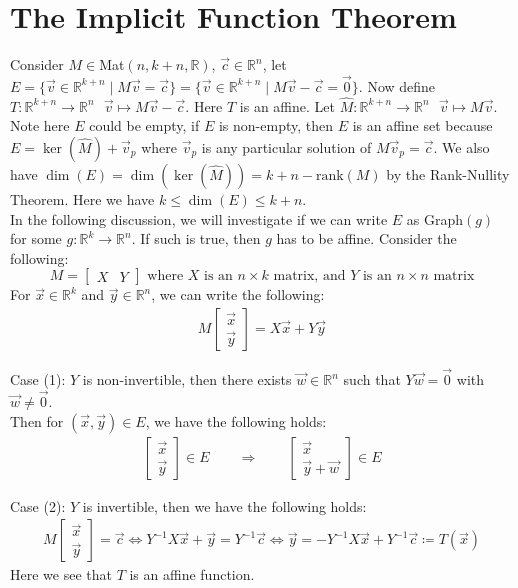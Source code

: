 \documentclass[11pt,oneside]{book}
\theoremstyle{break}
\theoremstyle{break}
\newcommand{\R}{\mathbb{R}}
\begin{document}
\newpage
\section[The Implicit Function Theorem]{\color{red}The Implicit Function Theorem \color{black}}
Consider $M \in $Mat$(n,k+n,\R)$, $\vec{c}\in \R^n$, let $E=\{ \vec{v}\in \R^{k+n} \mid M\vec{v} = \vec{c}\}=\{ \vec{v}\in \R^{k+n} \mid M\vec{v}- \vec{c}=\vec{0}\}$. Now define $T:\R^{k+n} \to \R^{n} \ \ \ \vec{v}\mapsto M\vec{v}-\vec{c}$. Here $T$ is an affine.  Let $\hat{M}: \R^{k+n} \to \R^n \ \ \ \vec{v}\mapsto M\vec{v}$. Note here $E$ could be empty, if $E$ is non-empty, then $E $ is an affine set because $E=\ker(\hat{M})+\vec{v}_p$ where $\vec{v}_p$ is any particular solution of $M\vec{v}_p = \vec{c}$. We also have $\dim(E) = \dim(\ker(\hat{M})) = k+n - \text{rank}(M)$ by the Rank-Nullity Theorem. Here we have $k \leq \dim(E) \leq k+n$. \\

In the following discussion, we will investigate if we can write $E$ as Graph$(g)$ for some $g:\R^k \to \R^n$. If such is true, then $g$ has to be affine. Consider the following:
$$M=\begin{bmatrix}
X & Y
\end{bmatrix}\text{ where }X\text{ is an }n\times k\text{ matrix, and } Y \text{ is an }n\times n\text{ matrix}$$
For $\vec{x}\in \R^k$ and $\vec{y}\in \R^n$, we can write the following:
\begin{align*}
M\begin{bmatrix}
\vec{x}\\\vec{y}
\end{bmatrix} = X\vec{x} + Y\vec{y}
\end{align*}

Case (1): $Y$ is non-invertible, then there exists $\vec{w}\in \R^n$ such that $Y\vec{w} = \vec{0}$ with $\vec{w}\neq \vec{0}$.\\ Then for $(\vec{x},\vec{y}) \in E$, we have the following holds:
\begin{align*}
\begin{bmatrix}
\vec{x}\\\vec{y}
\end{bmatrix} \in E \qquad\Rightarrow \qquad \begin{bmatrix}
\vec{x}\\\vec{y}+\vec{w}
\end{bmatrix} \in E
\end{align*}

Case (2): $Y$ is invertible, then we have the following holds:
\begin{align*}
M\begin{bmatrix}
\vec{x}\\\vec{y}
\end{bmatrix} = \vec{c} \iff Y^{-1}X\vec{x} + \vec{y} = Y^{-1}\vec{c} \iff \vec{y} = -Y^{-1}X\vec{x}+ Y^{-1}\vec{c} \coloneqq T(\vec{x})
\end{align*}
Here we see that $T$ is an affine function.\\
\end{document}

